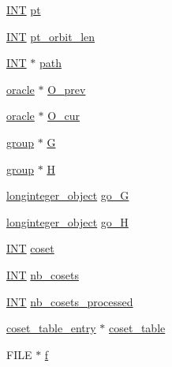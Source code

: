 \begin{DoxyCompactItemize}
\item 
\mbox{\hyperlink{galois_8h_a09fddde158a3a20bd2dcadb609de11dc}{I\+NT}} \mbox{\hyperlink{classupstep__work_a2b04a68048e09c039fce40fa8c99ff93}{pt}}
\item 
\mbox{\hyperlink{galois_8h_a09fddde158a3a20bd2dcadb609de11dc}{I\+NT}} \mbox{\hyperlink{classupstep__work_aded3e43b11eb95c55dbb757f3c05526d}{pt\+\_\+orbit\+\_\+len}}
\item 
\mbox{\hyperlink{galois_8h_a09fddde158a3a20bd2dcadb609de11dc}{I\+NT}} $\ast$ \mbox{\hyperlink{classupstep__work_af7c174873e3d99d1fd1fdf4b3c28f351}{path}}
\item 
\mbox{\hyperlink{classoracle}{oracle}} $\ast$ \mbox{\hyperlink{classupstep__work_a2142b2a82cf271b94228333be2315f03}{O\+\_\+prev}}
\item 
\mbox{\hyperlink{classoracle}{oracle}} $\ast$ \mbox{\hyperlink{classupstep__work_a32900c7d4b9015bc65c303830d973478}{O\+\_\+cur}}
\item 
\mbox{\hyperlink{classgroup}{group}} $\ast$ \mbox{\hyperlink{classupstep__work_a227c1e78abbdbc7d69a3c341de6e016c}{G}}
\item 
\mbox{\hyperlink{classgroup}{group}} $\ast$ \mbox{\hyperlink{classupstep__work_af144ac4b518bf14313854bc70ae98a5e}{H}}
\item 
\mbox{\hyperlink{classlonginteger__object}{longinteger\+\_\+object}} \mbox{\hyperlink{classupstep__work_afd80dc0ad4bf6b307310f24e5d204cb3}{go\+\_\+G}}
\item 
\mbox{\hyperlink{classlonginteger__object}{longinteger\+\_\+object}} \mbox{\hyperlink{classupstep__work_aef3d79257af28fe41d03c61c6345a560}{go\+\_\+H}}
\item 
\mbox{\hyperlink{galois_8h_a09fddde158a3a20bd2dcadb609de11dc}{I\+NT}} \mbox{\hyperlink{classupstep__work_ac4031be49b9093dc7231142dc66073fe}{coset}}
\item 
\mbox{\hyperlink{galois_8h_a09fddde158a3a20bd2dcadb609de11dc}{I\+NT}} \mbox{\hyperlink{classupstep__work_ae661a409c3bb507160b274bfa63f0ff8}{nb\+\_\+cosets}}
\item 
\mbox{\hyperlink{galois_8h_a09fddde158a3a20bd2dcadb609de11dc}{I\+NT}} \mbox{\hyperlink{classupstep__work_a419609fd485fe94797c256e5be652aff}{nb\+\_\+cosets\+\_\+processed}}
\item 
\mbox{\hyperlink{structcoset__table__entry}{coset\+\_\+table\+\_\+entry}} $\ast$ \mbox{\hyperlink{classupstep__work_a7dd68a0b9009863c731d470bf57c2b6b}{coset\+\_\+table}}
\item 
F\+I\+LE $\ast$ \mbox{\hyperlink{classupstep__work_af0f379026e8c7a70ec66c5bfd1b5a04c}{f}}
\end{DoxyCompactItemize}


